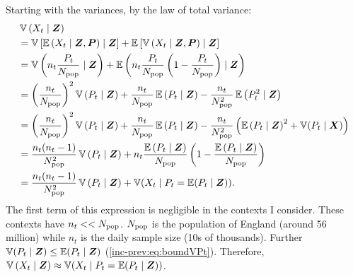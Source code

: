 \documentclass[thesis.tex]{subfiles}
\begin{document}
Starting with the variances, by the law of total variance:
\begin{align}
  &\operatorname{\mathbb{V}}\left( X_t \mid \bm{Z} \right) \\
    &= \operatorname{\mathbb{V}}\left[\operatorname{\mathbb{E}}\left( X_t \mid \bm{Z}, \bm{P} \right) \mid \bm{Z} \right] + \operatorname{\mathbb{E}}\left[\operatorname{\mathbb{V}}\left( X_t \mid \bm{Z}, \bm{P} \right) \mid \bm{Z} \right] \\
    &= \operatorname{\mathbb{V}}\left( n_t \frac{P_t}{N_\text{pop}} \mid \bm{Z} \right) + \operatorname{\mathbb{E}}\left( n_t \frac{P_t}{N_\text{pop}} \left(1 - \frac{P_t}{N_\text{pop}} \right) \mid \bm{Z} \right) \\
    &= \left( \frac{n_t}{N_\text{pop}} \right)^2 \operatorname{\mathbb{V}}\left(P_t \mid \bm{Z} \right) + \frac{n_t}{N_\text{pop}} \operatorname{\mathbb{E}}\left(P_t \mid \bm{Z} \right)  - \frac{n_t}{N_\text{pop}^2} \operatorname{\mathbb{E}}\left(P_t^2 \mid \bm{Z} \right) \\
    &= \left( \frac{n_t}{N_\text{pop}} \right)^2 \operatorname{\mathbb{V}}\left(P_t \mid \bm{Z} \right) + \frac{n_t}{N_\text{pop}} \operatorname{\mathbb{E}}\left(P_t \mid \bm{Z} \right)  - \frac{n_t}{N_\text{pop}^2} \left(\operatorname{\mathbb{E}}\left(P_t \mid \bm{Z} \right) ^ 2 + \operatorname{\mathbb{V}}(P_t \mid \bm{X})\right) \\
    &= \frac{n_t(n_t - 1)}{N_\text{pop}^2} \operatorname{\mathbb{V}}\left(P_t \mid \bm{Z} \right) + n_t \frac{\operatorname{\mathbb{E}}\left(P_t \mid \bm{Z} \right)}{N_\text{pop}}\left(1 - \frac{\operatorname{\mathbb{E}}\left(P_t \mid \bm{Z} \right)}{N_\text{pop}} \right) \\
    &= \frac{n_t(n_t - 1)}{N_\text{pop}^2} \operatorname{\mathbb{V}}\left(P_t \mid \bm{Z} \right) + \operatorname{\mathbb{V}}(X_t \mid P_t = \operatorname{\mathbb{E}}(P_t \mid \bm{Z})).
\end{align}
The first term of this expression is negligible in the contexts I consider.
These contexts have $n_t << N_\text{pop}$.
$N_\text{pop}$ is the population of England (around 56 million) while $n_t$ is the daily sample size (10s of thousands).
Further $\operatorname{\mathbb{V}}(P_t \mid \bm{Z}) \leq \operatorname{\mathbb{E}}(P_t \mid \bm{Z})$ (\cref{inc-prev:eq:boundVPt}).
Therefore, $\operatorname{\mathbb{V}}\left( X_t \mid \bm{Z} \right) \approx \operatorname{\mathbb{V}}(X_t \mid P_t = \operatorname{\mathbb{E}}(P_t \mid \bm{Z}))$.
\end{document}
